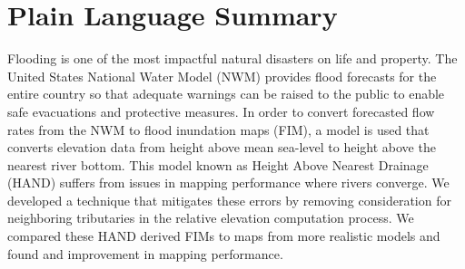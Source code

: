 \section*{Plain Language Summary}
Flooding is one of the most impactful natural disasters on life and property.
The United States National Water Model (NWM) provides flood forecasts for the entire country so that adequate warnings can be raised to the public to enable safe evacuations and protective measures.
In order to convert forecasted flow rates from the NWM to flood inundation maps (FIM), a model is used that converts elevation data from height above mean sea-level to height above the nearest river bottom.
This model known as Height Above Nearest Drainage (HAND) suffers from issues in mapping performance where rivers converge.
We developed a technique that mitigates these errors by removing consideration for neighboring tributaries in the relative elevation computation process.
We compared these HAND derived FIMs to maps from more realistic models and found and improvement in mapping performance.
%
